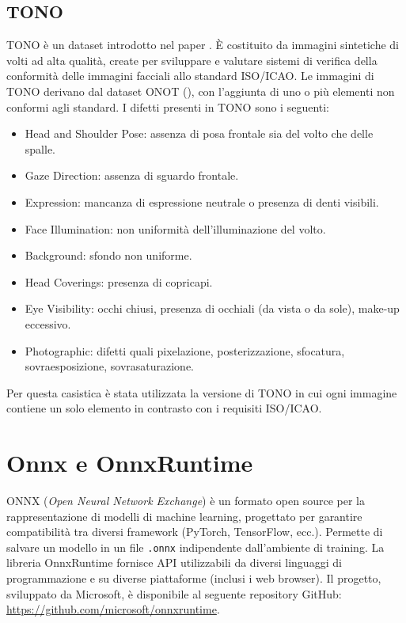 \documentclass[12pt,a4paper,openright,twoside]{book}
\begin{document}
\subsection{TONO}
TONO è un dataset introdotto nel paper \cite[TONO: a synthetic dataset for face image compliance to ISO/ICAO standard]{borghi2024tono}.
È costituito da immagini sintetiche di volti ad alta qualità, create per sviluppare e valutare sistemi di verifica della conformità delle immagini facciali allo standard ISO/ICAO.
Le immagini di TONO derivano dal dataset ONOT (\cite{di2024onot}), con l'aggiunta di uno o più elementi non conformi agli standard.
I difetti presenti in TONO sono i seguenti: 
\begin{itemize}
    \item Head and Shoulder Pose: assenza di posa frontale sia del volto che delle spalle.
    \item Gaze Direction: assenza di sguardo frontale.
    \item Expression: mancanza di espressione neutrale o presenza di denti visibili.
    \item Face Illumination: non uniformità dell'illuminazione del volto.
    \item Background: sfondo non uniforme.
    \item Head Coverings: presenza di copricapi.
    \item Eye Visibility: occhi chiusi, presenza di occhiali (da vista o da sole), make-up eccessivo.
    \item Photographic: difetti quali pixelazione, posterizzazione, sfocatura, sovraesposizione, sovrasaturazione.
\end{itemize}
Per questa casistica è stata utilizzata la versione di TONO in cui ogni immagine contiene un solo elemento in contrasto con i requisiti ISO/ICAO.

\section{Onnx e OnnxRuntime}
ONNX (\textit{Open Neural Network Exchange}) è un formato open source per la rappresentazione di modelli di machine learning, progettato per garantire compatibilità tra diversi framework (PyTorch, TensorFlow, ecc.).
Permette di salvare un modello in un file \texttt{.onnx} indipendente dall'ambiente di training.
La libreria OnnxRuntime fornisce API utilizzabili da diversi linguaggi di programmazione e su diverse piattaforme (inclusi i web browser).
Il progetto, sviluppato da Microsoft, è disponibile al seguente repository GitHub: \href{https://github.com/microsoft/onnxruntime}{https://github.com/microsoft/onnxruntime}.
\end{document}

